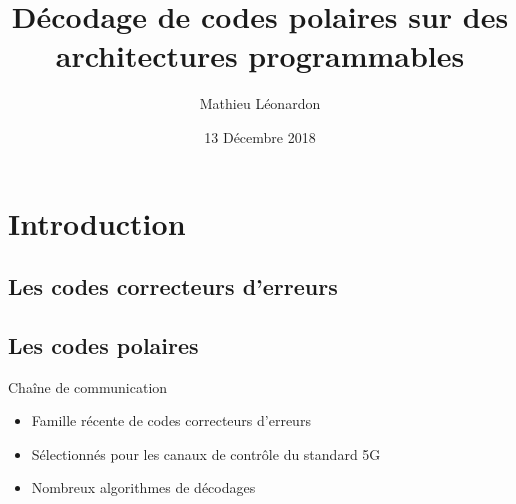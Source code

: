 \documentclass[t,compress,mathserif,12pt,xcolor=dvipsnames]{beamer}
\title{\textbf{Décodage de codes polaires sur des architectures programmables}}
\author[Mathieu Léonardon\hspace{7.51cm}{mathieu.leonardon@ims-bordeaux.fr}]    {Mathieu Léonardon}
\date{13 Décembre 2018}
\begin{document}
\begin{frame}[c]
\titlepage
\end{frame}

\begin{frame}[c]
	\tableofcontents[
	subsectionstyle=hide,
	]
\end{frame}




\section[Introduction]{Introduction}
\subsection{Les codes correcteurs d'erreurs}
\subsection{Les codes polaires}

\begin{frame}[c]{Chaîne de communication}
	\begin{itemize}
		\item Famille récente de codes correcteurs d'erreurs \cite{arikan2009channel}
		\vspace*{0.5cm}
		\item Sélectionnés pour les canaux de contrôle du standard 5G\cite{TS38212}
		\vspace*{0.5cm}
		\item Nombreux algorithmes de décodages
		\vspace*{0.5cm}
	\end{itemize}
\end{frame}
\end{document}
